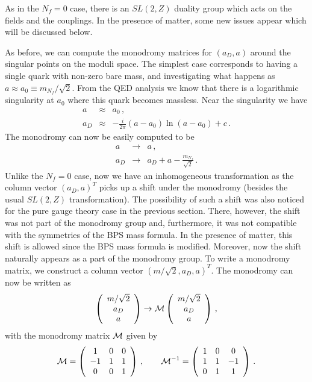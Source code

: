 As in the $N_f=0$ case, there is an $SL(2,Z)$ duality group which acts
on the fields and the couplings. In the presence of matter, some new
issues appear which will be discussed below.

As before, we can compute the monodromy matrices for $(a_D,a)$ around
the singular points on the moduli space.  The simplest case
corresponds to having a single quark with non-zero bare mass, and
investigating what happens as $a \approx a_0 \equiv m_{N_f} /
\sqrt{2}$.  From the QED analysis we know that there is a logarithmic
singularity at $a_0$ where this quark becomes massless. Near the
singularity we have 
$$
\begin{array}{rcl}
a& \approx & a_0\,, \\
a_D & \approx & - \frac{i}{2\pi} (a-a_0) \ln (a-a_0) +
c\,. 
\end{array}
$$
The monodromy can now be easily computed to be
$$
\begin{array}{rcl}
a &\rightarrow & a \,,\\
a_D &\rightarrow &\displaystyle{ a_D + a - \frac{m_{N_f}}{\sqrt{2}}}\,.
\end{array}
$$
Unlike the $N_f = 0$ case, now we have an inhomogeneous transformation
as the column vector $(a_D, a)^T$ picks up a shift under the monodromy
(besides the usual $SL(2,Z)$ transformation). The possibility of such
a shift was also noticed for the pure gauge theory case in the
previous section. There, however, the shift was not part of the
monodromy group and, furthermore, it was not compatible with the
symmetries of the BPS mass formula. In the presence of matter, this
shift is allowed since the BPS mass formula is modified. Moreover, now
the shift naturally appears as a part of the monodromy group. To write
a monodromy matrix, we construct a column vector $(m/ \sqrt{2} , a_D ,
a )^T$. The monodromy can now be written as 
$$
\left ( \begin{array}{c} m/ \sqrt{2} \\ a_D \\ a \end{array} \right)
\rightarrow {\cal M} 
\left ( \begin{array}{c} m/ \sqrt{2} \\ a_D \\ a \end{array}\right)\,, 
$$
with the monodromy matrix ${\cal M}$ given by 
$$
{\cal M } = \left ( \begin{array}{ccc}
1 & 0 & 0 \\ -1 & 1 & 1 \\ 0 & 0 & 1
\end{array} \right )\,,\qquad
{\cal M}^{-1} = \left(\begin{array}{ccc}
1 & 0 & 0 \\ 1 & 1 & -1 \\ 0 & 1 & 1
\end{array}\right) \,.
$$
